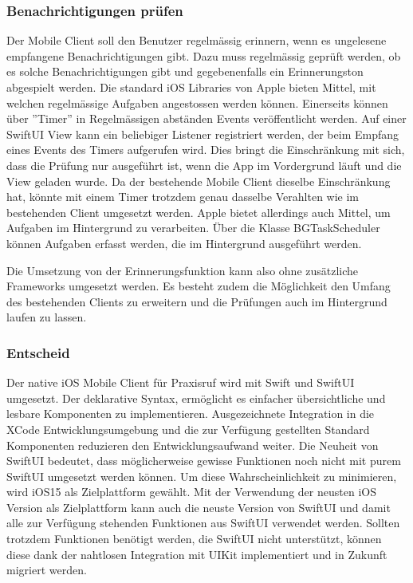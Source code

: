 \subsubsection*{Benachrichtigungen prüfen}

Der Mobile Client soll den Benutzer regelmässig erinnern, wenn es ungelesene empfangene Benachrichtigungen gibt.
Dazu muss regelmässig geprüft werden, ob es solche Benachrichtigungen gibt und gegebenenfalls ein Erinnerungston abgespielt werden.
Die standard iOS Libraries von Apple bieten Mittel, mit welchen regelmässige Aufgaben angestossen werden können.
Einerseits können über ''Timer'' in Regelmässigen abständen Events veröffentlicht werden.
Auf einer SwiftUI View kann ein beliebiger Listener registriert werden, der beim Empfang eines Events des Timers aufgerufen wird.
Dies bringt die Einschränkung mit sich, dass die Prüfung nur ausgeführt ist, wenn die App im Vordergrund läuft und die View geladen wurde.\cite{ios_timer}
Da der bestehende Mobile Client dieselbe Einschränkung hat, könnte mit einem Timer trotzdem genau dasselbe Verahlten wie im bestehenden Client umgesetzt werden.
Apple bietet allerdings auch Mittel, um Aufgaben im Hintergrund zu verarbeiten.
Über die Klasse BGTaskScheduler können Aufgaben erfasst werden, die im Hintergrund ausgeführt werden.\cite{ios_bgtaskscheduler}

Die Umsetzung von der Erinnerungsfunktion kann also ohne zusätzliche Frameworks umgesetzt werden.
Es besteht zudem die Möglichkeit den Umfang des bestehenden Clients zu erweitern und die Prüfungen auch im Hintergrund laufen zu lassen.

\subsubsection*{Entscheid}

Der native iOS Mobile Client für Praxisruf wird mit Swift und SwiftUI umgesetzt.
Der deklarative Syntax, ermöglicht es einfacher übersichtliche und lesbare Komponenten zu implementieren.
Ausgezeichnete Integration in die XCode Entwicklungsumgebung und die zur Verfügung gestellten Standard Komponenten reduzieren den Entwicklungsaufwand weiter.
Die Neuheit von SwiftUI bedeutet, dass möglicherweise gewisse Funktionen noch nicht mit purem SwiftUI umgesetzt werden können.
Um diese Wahrscheinlichkeit zu minimieren, wird iOS15 als Zielplattform gewählt.
Mit der Verwendung der neusten iOS Version als Zielplattform kann auch die neuste Version von SwiftUI und damit alle zur Verfügung stehenden Funktionen aus SwiftUI verwendet werden.
Sollten trotzdem Funktionen benötigt werden, die SwiftUI nicht unterstützt, können diese dank der nahtlosen Integration mit UIKit implementiert und in Zukunft migriert werden.

\clearpage
